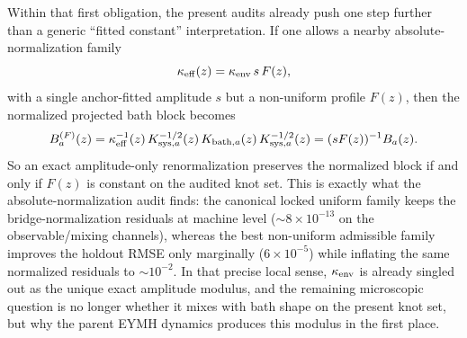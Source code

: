\documentclass[aps,prd,onecolumn,notitlepage,nofootinbib,superscriptaddress,11pt,floatfix]{revtex4-2}
\begin{document}
Within that first obligation, the present audits already push one step further than a generic ``fitted constant'' interpretation. If one allows a nearby absolute-normalization family
\[
\kappa_{\rm eff}(z)=\kappa_{\rm env}\,s\,F(z),
\]
with a single anchor-fitted amplitude $s$ but a non-uniform profile $F(z)$, then the normalized projected bath block becomes
\[
B_a^{(F)}(z)=\kappa_{\rm eff}^{-1}(z)\,K_{{\rm sys},a}^{-1/2}(z)\,K_{{\rm bath},a}(z)\,K_{{\rm sys},a}^{-1/2}(z)
=(sF(z))^{-1}B_a(z).
\]
So an exact amplitude-only renormalization preserves the normalized block if and only if $F(z)$ is constant on the audited knot set. This is exactly what the absolute-normalization audit finds: the canonical locked uniform family keeps the bridge-normalization residuals at machine level ($\sim 8\times10^{-13}$ on the observable/mixing channels), whereas the best non-uniform admissible family improves the holdout RMSE only marginally ($6\times10^{-5}$) while inflating the same normalized residuals to $\sim 10^{-2}$. In that precise local sense, $\kappa_{\rm env}$ is already singled out as the unique exact amplitude modulus, and the remaining microscopic question is no longer whether it mixes with bath shape on the present knot set, but why the parent EYMH dynamics produces this modulus in the first place.
\end{document}

